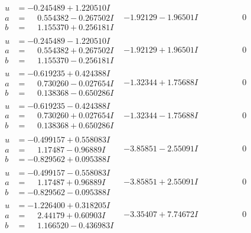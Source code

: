 \documentclass[1p]{elsarticle_modified}
\theoremstyle{definition}
\begin{document}
$$\begin{array}{c|c|c}
\begin{aligned}
u &= -0.245489 + 1.220510 I \\
a &= \phantom{-}0.554382 - 0.267502 I \\
b &= \phantom{-}1.155370 + 0.256181 I\end{aligned}
 & -1.92129 - 1.96501 I & \phantom{-0.000000 } 0 \\ \hline\begin{aligned}
u &= -0.245489 - 1.220510 I \\
a &= \phantom{-}0.554382 + 0.267502 I \\
b &= \phantom{-}1.155370 - 0.256181 I\end{aligned}
 & -1.92129 + 1.96501 I & \phantom{-0.000000 } 0 \\ \hline\begin{aligned}
u &= -0.619235 + 0.424388 I \\
a &= \phantom{-}0.730260 - 0.027654 I \\
b &= \phantom{-}0.138368 - 0.650286 I\end{aligned}
 & -1.32344 + 1.75688 I & \phantom{-0.000000 } 0 \\ \hline\begin{aligned}
u &= -0.619235 - 0.424388 I \\
a &= \phantom{-}0.730260 + 0.027654 I \\
b &= \phantom{-}0.138368 + 0.650286 I\end{aligned}
 & -1.32344 - 1.75688 I & \phantom{-0.000000 } 0 \\ \hline\begin{aligned}
u &= -0.499157 + 0.558083 I \\
a &= \phantom{-}1.17487 - 0.96889 I \\
b &= -0.829562 + 0.095388 I\end{aligned}
 & -3.85851 - 2.55091 I & \phantom{-0.000000 } 0 \\ \hline\begin{aligned}
u &= -0.499157 - 0.558083 I \\
a &= \phantom{-}1.17487 + 0.96889 I \\
b &= -0.829562 - 0.095388 I\end{aligned}
 & -3.85851 + 2.55091 I & \phantom{-0.000000 } 0 \\ \hline\begin{aligned}
u &= -1.226400 + 0.318205 I \\
a &= \phantom{-}2.44179 + 0.60903 I \\
b &= \phantom{-}1.166520 - 0.436983 I\end{aligned}
 & -3.35407 + 7.74672 I & \phantom{-0.000000 } 0 \\ \hline\begin{aligned}

\end{aligned}
\end{array}$$
\end{document}
